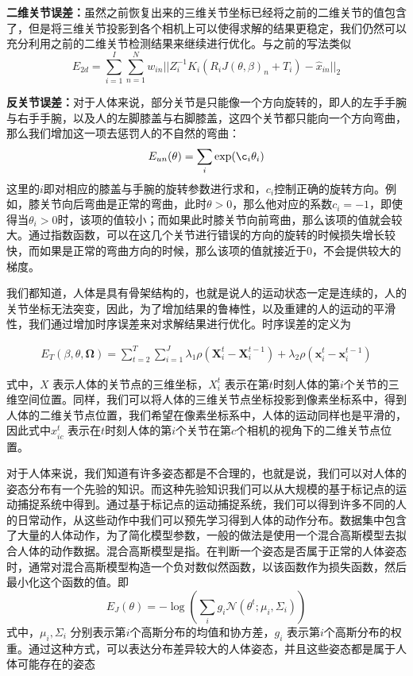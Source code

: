 \textbf{二维关节误差：}虽然之前恢复出来的三维关节坐标已经将之前的二维关节的值包含了，但是将三维关节投影到各个相机上可以使得求解的结果更稳定，我们仍然可以充分利用之前的二维关节检测结果来继续进行优化。与之前的写法类似
\begin{equation}
    E_{2d} = \sum^I_{i=1} \sum_{n=1}^N w_{in}||Z_i^{-1}K_i(R_iJ(\theta, \beta)_n + T_i) - \hat x_{in}||_2
\end{equation}

\textbf{反关节误差：}对于人体来说，部分关节是只能像一个方向旋转的，即人的左手手腕与右手手腕，以及人的左脚膝盖与右脚膝盖，这四个关节都只能向一个方向弯曲，那么我们增加这一项去惩罚人的不自然的弯曲：
\begin{equation}
    E_{un}(\theta) = \sum_i \exp(\c_i\theta_i)
\end{equation}
这里的\(i\)即对相应的膝盖与手腕的旋转参数进行求和，\(c_i\)控制正确的旋转方向。例如，膝关节向后弯曲是正常的弯曲，此时\(\theta>0\)，那么他对应的系数\(c_i = -1\)，即使得当\(\theta_i>0\)时，该项的值较小；而如果此时膝关节向前弯曲，那么该项的值就会较大。通过指数函数，可以在这几个关节进行错误的方向的旋转的时候损失增长较快，而如果是正常的弯曲方向的时候，那么该项的值就接近于0，不会提供较大的梯度。



我们都知道，人体是具有骨架结构的，也就是说人的运动状态一定是连续的，人的关节坐标无法突变，因此，为了增加结果的鲁棒性，以及重建的人的运动的平滑性，我们通过增加时序误差来对求解结果进行优化。时序误差的定义为

\begin{align} 
    E _ { T } ( \beta , \theta , \mathbf { \Omega } ) = \sum _ { t = 2 } ^ { T } \sum _ { i = 1 } ^ { J } \lambda _ { 1 } \rho \left( \mathbf { X } _ { i } ^ { t } - \mathbf { X } _ { i } ^ { t - 1 } \right) + \lambda _ { 2 } \rho \left( \mathbf { x } _ { i } ^ { t } - \mathbf { x } _ { i } ^ { t - 1 } \right)
\end{align}

式中，$X$ 表示人体的关节点的三维坐标，$X_i^t$ 表示在第$t$时刻人体的第$i$个关节的三维空间位置。同样，我们可以将人体的三维关节点坐标投影到像素坐标系中，得到人体的二维关节点位置，我们希望在像素坐标系中，人体的运动同样也是平滑的，因此式中$x_{ic}^t$ 表示在$t$时刻人体的第$i$个关节在第$c$个相机的视角下的二维关节点位置。
 
对于人体来说，我们知道有许多姿态都是不合理的，也就是说，我们可以对人体的姿态分布有一个先验的知识。而这种先验知识我们可以从大规模的基于标记点的运动捕捉系统中得到。通过基于标记点的运动捕捉系统，我们可以得到许多不同的人的日常动作，从这些动作中我们可以预先学习得到人体的动作分布。\cite{mocap}数据集中包含了大量的人体动作，为了简化模型参数，一般的做法是使用一个混合高斯模型去\cite{我也不知道哪篇}拟合人体的动作数据。混合高斯模型是指。在判断一个姿态是否属于正常的人体姿态时，通常对混合高斯模型构造一个负对数似然函数，以该函数作为损失函数，然后最小化这个函数的值。即
$$
    E _ { J } ( \theta ) = - \log \left( \sum _ { i } g _ { i } \mathcal { N } \left( \theta ^ { t } ; \mu _ { i } , \Sigma _ { i } \right) \right)
$$
式中，$\mu_i, \Sigma_i$ 分别表示第$i$个高斯分布的均值和协方差，$g_i$ 表示第$i$个高斯分布的权重。通过这种方式，可以表达分布差异较大的人体姿态，并且这些姿态都是属于人体可能存在的姿态

